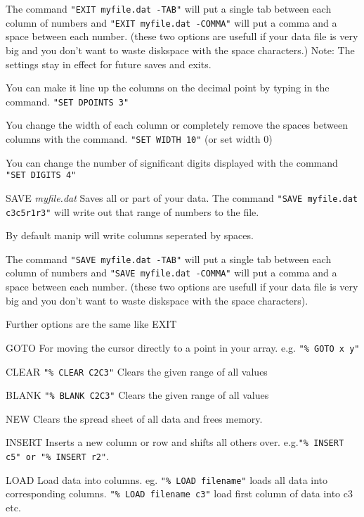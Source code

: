 \begin{commanddescription}
The command \verb#"EXIT myfile.dat -TAB"# will put a single tab between
each column of numbers and \verb#"EXIT myfile.dat -COMMA"# will put a
comma and a space between each number.  (these two options are
usefull if your data file is very big and you don't want to waste
diskspace with the space characters.)  
Note: The settings stay in effect for future saves and exits.

You can make it line up the columns on the decimal point by typing in the
command. \verb#"SET DPOINTS 3"#

You change the width of each column or completely remove the spaces
between columns with the command. \verb#"SET WIDTH 10"#  (or set width 0)

You can change the number of significant digits displayed with
the command \verb#"SET DIGITS 4"#

\item[{\sf SAVE {\it myfile.dat}}]
Saves all or part of your data.
The command \verb#"SAVE myfile.dat c3c5r1r3"# will write out that range of
numbers to the file.

By default manip will write columns seperated by spaces.

The command \verb#"SAVE myfile.dat -TAB"# will put a single tab between
each column of numbers and \verb#"SAVE myfile.dat -COMMA"# will put a
comma and a space between each number.  (these two options are
usefull if your data file is very big and you don't want to waste
diskspace with the space characters).

Further options are the same like {\sf EXIT}  

\item[{\sf GOTO}]
For moving the cursor directly to a point in your array.
e.g. \verb#"% GOTO x y"#

\item[{\sf CLEAR}]
\verb#"% CLEAR C2C3"# Clears the given range of all values

\item[{\sf BLANK}]
\verb#"% BLANK C2C3"# Clears the given range of all values

\item[{\sf NEW}]
Clears the spread sheet of all data and frees memory.

\item[{\sf INSERT}]
Inserts a new column or row and shifts all others over.
e.g.\verb#"% INSERT c5" or "% INSERT r2"#.

\item[{\sf LOAD}]
Load data into columns. eg. \verb#"% LOAD filename"# loads all 
data into corresponding columns. \verb#"% LOAD filename c3"#
load first column of data into c3 etc.


\end{commanddescription}
